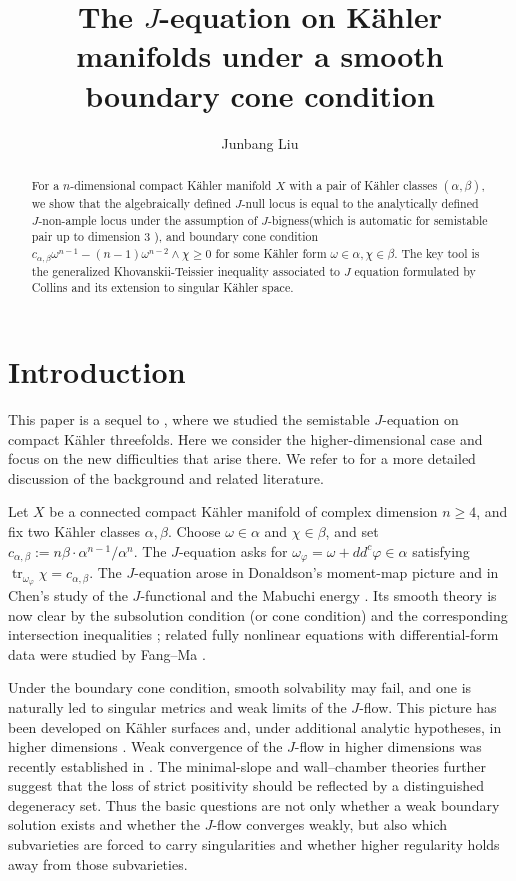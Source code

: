 \documentclass[reqno]{amsart}
\title{The $J$-equation on K\"ahler manifolds under a smooth boundary cone condition}
\author{Junbang Liu}
\newcommand{\tr}{\operatorname{tr}}
\newcommand{\ddc}{dd^c}
\newcommand{\cab}{c_{\alpha,\beta}}
\theoremstyle{plain}
\theoremstyle{remark}
\begin{document}
\maketitle
\begin{abstract}
    For a $n$-dimensional compact K\"ahler manifold $X$ with a pair of K\"ahler classes $(\alpha,\beta)$, we show that the algebraically defined $J$-null locus is equal to the analytically defined $J$-non-ample locus under the assumption of $J$-bigness(which is automatic for semistable pair up to dimension $3$ \cite{3d}),  and boundary cone condition $\cab\omega^{n-1}-(n-1)\omega^{n-2}\wedge\chi\geq 0$ for some K\"ahler form $\omega\in \alpha,\chi\in \beta$. The key tool is the generalized Khovanskii-Teissier inequality associated to $J$ equation formulated by Collins \cite{CT21} and its extension to singular K\"ahler space. 
\end{abstract}
\tableofcontents


\section{Introduction}

This paper is a sequel to \cite{3d}, where we studied the semistable
$J$-equation on compact K\"ahler threefolds. Here we consider the
higher-dimensional case and focus on the new difficulties that arise
there. We refer to \cite{3d} for a more detailed discussion of the
background and related literature.

Let $X$ be a connected compact K\"ahler manifold of complex dimension
$n\geq4$, and fix two K\"ahler classes $\alpha,\beta$. Choose
$\omega\in\alpha$ and $\chi\in\beta$, and set $\cab:=n\beta\cdot\alpha^{n-1}/{\alpha^n}.$
The $J$-equation asks for
$\omega_\varphi=\omega+\ddc\varphi\in\alpha$ satisfying
$\tr_{\omega_\varphi}\chi=\cab$.
The $J$-equation arose in Donaldson's moment-map picture and in
Chen's study of the $J$-functional and the Mabuchi energy
\cite{D99,C00,C04}. Its smooth theory is now clear by the
subsolution condition (or cone condition) and the corresponding
intersection inequalities
\cite{SW08,LS15,CS17,C21,DP21,S20}; related fully nonlinear equations
with differential-form data were studied by Fang--Ma \cite{FM24}.

Under the boundary cone condition, smooth solvability may fail, and
one is naturally led to singular metrics and weak limits of the
$J$-flow. This picture has
been developed on K\"ahler surfaces
\cite{FLSW14,M26a} and, under additional analytic
hypotheses, in higher dimensions \cite{S24}. Weak convergence of the
$J$-flow in higher dimensions was recently established in
\cite{M26b}. The minimal-slope and
wall--chamber theories \cite{DMS26,KSD26,F26} further suggest that the
loss of strict positivity should be reflected by a distinguished
degeneracy set. Thus the basic questions are not only whether a weak
boundary solution exists and whether the $J$-flow converges weakly,
but also which subvarieties are forced to carry singularities and
whether higher regularity holds away from those subvarieties.
\end{document}
